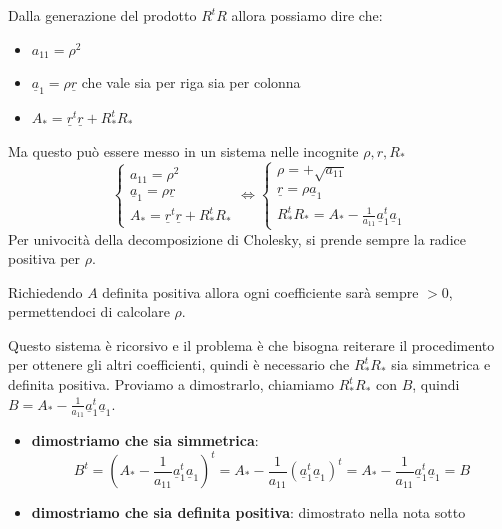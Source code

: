 Dalla generazione del prodotto $R^tR$ allora possiamo dire che:
\begin{itemize}
    \item $a_{11} = \rho ^2$
    \item $\underline{a}_1= \rho \underline{r}$ che vale sia per riga sia per colonna
    \item $A_\ast = \underline{r}^t\underline{r}+R_\ast^t R_\ast$
\end{itemize}
Ma questo può essere messo in un sistema nelle incognite $\rho, r, R_\ast$
\begin{equation*}
    \begin{cases}
        a_{11} = \rho ^2\\
        \underline{a}_1= \rho \underline{r}\\
        A_\ast = \underline{r}^t\underline{r}+R_\ast^t R_\ast
    \end{cases}\iff \begin{cases}
        \rho = +\sqrt{a_{11}}\\
        \underline{r}= \rho  \underline{a}_1\\
        R_\ast^t R_\ast = A_\ast - \frac{1}{a_{11}} \underline{a}_1^t \underline{a}_1
    \end{cases}
\end{equation*}
Per univocità della decomposizione di Cholesky, si prende sempre la radice positiva
per $\rho$.
\begin{nota}
    Richiedendo $A$ definita positiva allora ogni coefficiente sarà sempre $>0$,
    permettendoci di calcolare $\rho$.
\end{nota}

Questo sistema è ricorsivo e il problema è che bisogna reiterare 
il procedimento per ottenere gli altri coefficienti, quindi è necessario che $R_\ast ^t R_\ast$ 
sia simmetrica e definita positiva. Proviamo a dimostrarlo, chiamiamo $R_\ast ^t R_\ast$ con $B$,
quindi $B=A_\ast - \frac{1}{a_{11}} \underline{a}_1^t \underline{a}_1$.
\begin{itemize}
    \item \textbf{dimostriamo che sia simmetrica}:
    \begin{equation*}
        B^t = \left(A_\ast - \frac{1}{a_{11}} \underline{a}_1^t \underline{a}_1\right)^t= A_\ast - \frac{1}{a_{11}} (\underline{a}_1^t \underline{a}_1)^t =A_\ast - \frac{1}{a_{11}} \underline{a}_1^t \underline{a}_1 = B  
    \end{equation*}
    \item \textbf{dimostriamo che sia definita positiva}: dimostrato nella nota sotto
\end{itemize}

